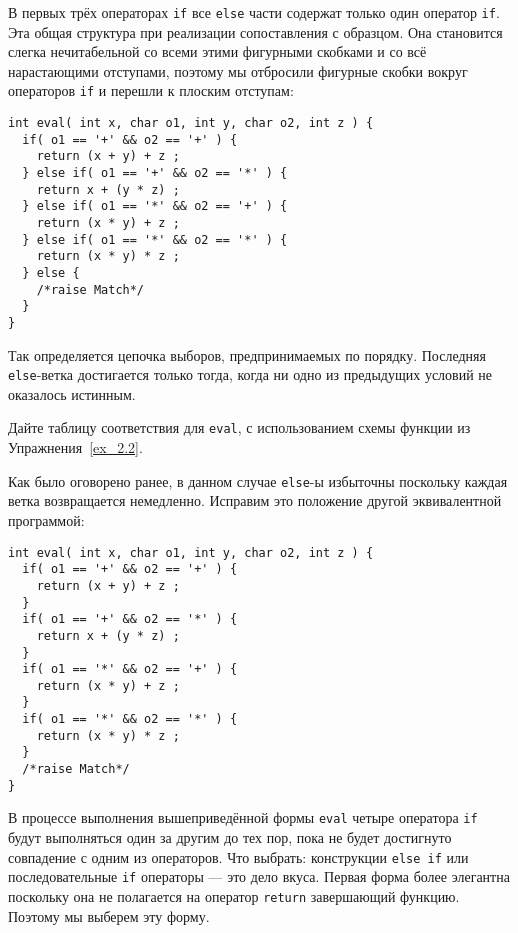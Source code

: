 В первых трёх операторах \lstinline|if| все \lstinline|else| части содержат только один оператор \lstinline|if|. Эта общая структура при реализации сопоставления с образцом. Она становится слегка нечитабельной со всеми этими фигурными скобками и со всё нарастающими отступами, поэтому мы отбросили фигурные скобки вокруг операторов \lstinline|if| и перешли к плоским отступам:

\begin{lstlisting}
int eval( int x, char o1, int y, char o2, int z ) {
  if( o1 == '+' && o2 == '+' ) {
    return (x + y) + z ;
  } else if( o1 == '+' && o2 == '*' ) {
    return x + (y * z) ;
  } else if( o1 == '*' && o2 == '+' ) {
    return (x * y) + z ;
  } else if( o1 == '*' && o2 == '*' ) {
    return (x * y) * z ;
  } else {
    /*raise Match*/
  }
}
\end{lstlisting}

Так определяется цепочка выборов, предпринимаемых по порядку. Последняя \lstinline|else|-ветка достигается только тогда, когда ни одно из предыдущих условий не оказалось истинным.


\exercise Дайте таблицу соответствия для \lstinline|eval|, с использованием схемы функции из Упражнения~\ref{ex_2.2}.\label{ex_2.3}

Как было оговорено ранее, в данном случае \lstinline|else|-ы избыточны поскольку каждая ветка возвращается немедленно. Исправим это положение другой эквивалентной программой:

\begin{lstlisting}
int eval( int x, char o1, int y, char o2, int z ) {
  if( o1 == '+' && o2 == '+' ) {
    return (x + y) + z ;
  }
  if( o1 == '+' && o2 == '*' ) {
    return x + (y * z) ;
  }
  if( o1 == '*' && o2 == '+' ) {
    return (x * y) + z ;
  }
  if( o1 == '*' && o2 == '*' ) {
    return (x * y) * z ;
  }
  /*raise Match*/
}
\end{lstlisting}

В процессе выполнения вышеприведённой формы \lstinline|eval| четыре оператора \lstinline|if| будут выполняться один за другим до тех пор, пока не будет достигнуто совпадение с одним из операторов. Что выбрать: конструкции \lstinline|else if| или последовательные \lstinline|if| операторы --- это дело вкуса. Первая форма более элегантна поскольку она не полагается на оператор \lstinline|return| завершающий функцию. Поэтому мы выберем эту форму.

